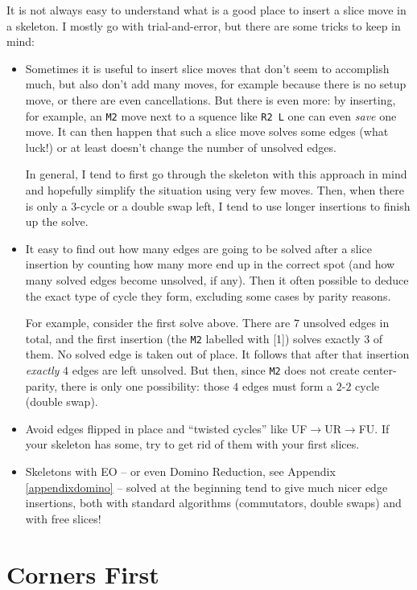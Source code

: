 \documentclass[11pt,a4paper]{book}
\newcommand{\m}{\texttt}
\begin{document}
It is not always easy to understand what is a good place to insert a slice move in a skeleton. I mostly go with trial-and-error, but there are some tricks to keep in mind:
\begin{itemize}
\item Sometimes it is useful to insert slice moves that don't seem to accomplish much, but also don't add many moves, for example because there is no setup move, or there are even cancellations. But there is even more: by inserting, for example, an \m{M2} move next to a squence like \m{R2 L} one can even \textit{save} one move. It can then happen that such a slice move solves some edges (what luck!) or at least doesn't change the number of unsolved edges.

In general, I tend to first go through the skeleton with this approach in mind and hopefully simplify the situation using very few moves. Then, when there is only a 3-cycle or a double swap left, I tend to use longer insertions to finish up the solve.
\item It easy to find out how many edges are going to be solved after a slice insertion by counting how many more end up in the correct spot (and how many solved edges become unsolved, if any). Then it often possible to deduce the exact type of cycle they form, excluding some cases by parity reasons.

For example, consider the first solve above. There are $7$ unsolved edges in total, and the first insertion (the \m{M2} labelled with [1]) solves exactly 3 of them. No solved edge is taken out of place. It follows that after that insertion \textit{exactly} $4$ edges are left unsolved. But then, since \m{M2} does not create center-parity, there is only one possibility: those $4$ edges must form a $2$-$2$ cycle (double swap).
\item Avoid edges flipped in place and ``twisted cycles'' like UF$\to$UR$\to$FU. If your skeleton has some, try to get rid of them with your first slices.
\item Skeletons with EO -- or even Domino Reduction, see Appendix \ref{appendixdomino} -- solved at the beginning tend to give much nicer edge insertions, both with standard algorithms (commutators, double swaps) and with free slices!
\end{itemize}

\section{Corners First}
\label{corner-first}
\end{document}
